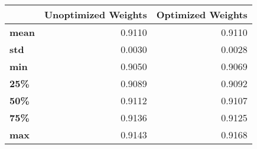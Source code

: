 \begin{tabular}{lrr}
\toprule
{} &  Unoptimized Weights &  Optimized Weights \\
\midrule
\textbf{mean} &               0.9110 &             0.9110 \\
\textbf{std } &               0.0030 &             0.0028 \\
\textbf{min } &               0.9050 &             0.9069 \\
\textbf{25\% } &               0.9089 &             0.9092 \\
\textbf{50\% } &               0.9112 &             0.9107 \\
\textbf{75\% } &               0.9136 &             0.9125 \\
\textbf{max } &               0.9143 &             0.9168 \\
\bottomrule
\end{tabular}

